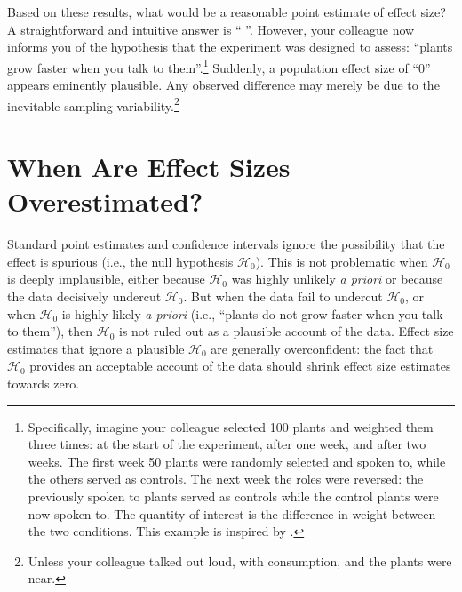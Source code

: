 \documentclass[a4paper]{article}
\newcommand{\getValue}[3]{%
	\pgfplotstablegetelem{#1}{#2}\of{#3}%
	\pgfmathprintnumber{\pgfplotsretval}%
}
\begin{document}
Based on these results, what would be a reasonable point estimate of effect size? A straightforward and intuitive answer is ``\getValue{0}{Estimate}{\tbEffectSizeExample}''. However, your colleague now informs you of the hypothesis that the experiment was designed to assess: ``plants grow faster when you talk to them''.\footnote{Specifically, imagine your colleague selected 100 plants and weighted them three times: at the start of the experiment, after one week, and after two weeks. The first week 50 plants were randomly selected and spoken to, while the others served as controls. The next week the roles were reversed: the previously spoken to plants served as controls while the control plants were now spoken to. The quantity of interest is the difference in weight between the two conditions. This example is inspired by \protect{}.} Suddenly, a population effect size of ``0'' appears eminently plausible. Any observed difference may merely be due to the inevitable sampling variability.\footnote{Unless your colleague talked out loud, with consumption, and the plants were near.}

\section*{When Are Effect Sizes Overestimated?}
Standard point estimates and confidence intervals ignore the possibility that the effect is spurious (i.e., the null hypothesis $\mathcal{H}_0$). This is not problematic when $\mathcal{H}_0$ is deeply implausible, either because $\mathcal{H}_0$ was highly unlikely \emph{a priori} or because the data decisively undercut $\mathcal{H}_0$. But when the data fail to undercut $\mathcal{H}_0$, or when $\mathcal{H}_0$ is highly likely \emph{a priori} (i.e., ``plants do not grow faster when you talk to them''), then $\mathcal{H}_0$ is not ruled out as a plausible account of the data. Effect size estimates that ignore a plausible $\mathcal{H}_0$ are generally overconfident: the fact that $\mathcal{H}_0$ provides an acceptable account of the data should shrink effect size estimates towards zero.
\end{document}

